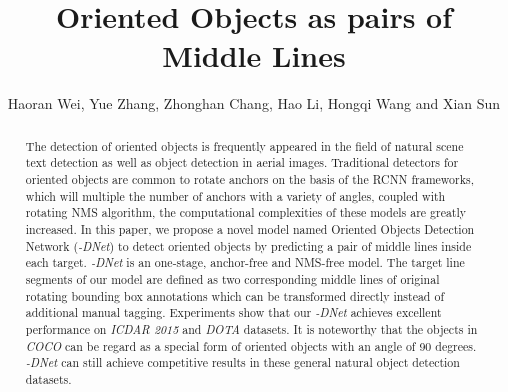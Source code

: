 \documentclass[runningheads]{llncs}
\begin{document}
\newcommand*\rfrac[2]{{}^{#1}\!/_{#2}}
\newcommand{\layername}[1]{{\fontfamily{qcr}\selectfont#1}}
\newcommand{\myparagraph}[1]{{\vspace{0.5em} \noindent \bf #1}}

\pagestyle{headings}
\mainmatter

\def\eg{\emph{e.g.}} \def\Eg{\emph{E.g.}}
\def\ie{\emph{i.e.}} \def\Ie{\emph{I.e}\onedot}
\def\cf{\emph{c.f.}} \def\Cf{\emph{C.f}\onedot}
\def\etc{\emph{etc}.} \def\vs{\emph{vs}\onedot}
\def\wrt{w.r.t.} \def\dof{d.o.f.}
\def\etal{\emph{et al.}}

\title{Oriented Objects as pairs of Middle Lines} 






\author{Haoran Wei, Yue Zhang, Zhonghan Chang,  Hao Li, Hongqi Wang and Xian Sun}




\maketitle

\begin{abstract}

The detection of oriented objects is frequently appeared in the field of natural scene text detection as well as object detection in aerial images. Traditional detectors for oriented objects are common to rotate anchors on the basis of the RCNN frameworks, which will multiple the number of anchors with a variety of angles, coupled with rotating NMS algorithm, the computational complexities of these models are greatly increased. In this paper, we propose a novel model named Oriented Objects Detection Network (\textit{-DNet}) to detect oriented objects by predicting a pair of middle lines inside each target. \textit{-DNet} is an one-stage, anchor-free and NMS-free model. The target line segments of our model are defined as two corresponding middle lines of original rotating bounding box annotations which can be transformed directly instead of additional manual tagging. Experiments show that our \textit{-DNet} achieves excellent performance on \textit{ICDAR 2015} and \textit{DOTA} datasets. It is noteworthy that the objects in \textit{COCO} can be regard as a special form of oriented objects with an angle of 90 degrees. \textit{-DNet} can still achieve competitive results in these general natural object detection datasets.


\end{abstract}
\end{document}
